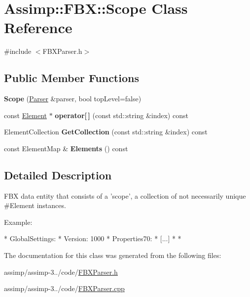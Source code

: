 \hypertarget{class_assimp_1_1_f_b_x_1_1_scope}{\section{Assimp\+:\+:F\+B\+X\+:\+:Scope Class Reference}
\label{class_assimp_1_1_f_b_x_1_1_scope}
}


{\ttfamily \#include $<$F\+B\+X\+Parser.\+h$>$}

\subsection*{Public Member Functions}
\begin{DoxyCompactItemize}
\item 
\hypertarget{class_assimp_1_1_f_b_x_1_1_scope_a0da3f8b1366ad12487a3d213edff839e}{{\bfseries Scope} (\hyperlink{class_assimp_1_1_f_b_x_1_1_parser}{Parser} \&parser, bool top\+Level=false)}\label{class_assimp_1_1_f_b_x_1_1_scope_a0da3f8b1366ad12487a3d213edff839e}

\item 
\hypertarget{class_assimp_1_1_f_b_x_1_1_scope_a594bb7d0f4bef729494a57556fc7a5e2}{const \hyperlink{class_assimp_1_1_f_b_x_1_1_element}{Element} $\ast$ {\bfseries operator\mbox{[}$\,$\mbox{]}} (const std\+::string \&index) const }\label{class_assimp_1_1_f_b_x_1_1_scope_a594bb7d0f4bef729494a57556fc7a5e2}

\item 
\hypertarget{class_assimp_1_1_f_b_x_1_1_scope_a2d1db433df9aefb0f367f1575a76be1b}{Element\+Collection {\bfseries Get\+Collection} (const std\+::string \&index) const }\label{class_assimp_1_1_f_b_x_1_1_scope_a2d1db433df9aefb0f367f1575a76be1b}

\item 
\hypertarget{class_assimp_1_1_f_b_x_1_1_scope_aa603645f998adca821ed1ec25cd493a6}{const Element\+Map \& {\bfseries Elements} () const }\label{class_assimp_1_1_f_b_x_1_1_scope_aa603645f998adca821ed1ec25cd493a6}

\end{DoxyCompactItemize}


\subsection{Detailed Description}
F\+B\+X data entity that consists of a 'scope', a collection of not necessarily unique \#\+Element instances.

Example\+: \begin{DoxyVerb}*    GlobalSettings:  {
*        Version: 1000
*        Properties70: 
*        [...]
*    }
*  \end{DoxyVerb}
 

The documentation for this class was generated from the following files\+:\begin{DoxyCompactItemize}
\item 
assimp/assimp-\/3../code/\hyperlink{_f_b_x_parser_8h}{F\+B\+X\+Parser.\+h}\item 
assimp/assimp-\/3../code/\hyperlink{_f_b_x_parser_8cpp}{F\+B\+X\+Parser.\+cpp}\end{DoxyCompactItemize}
